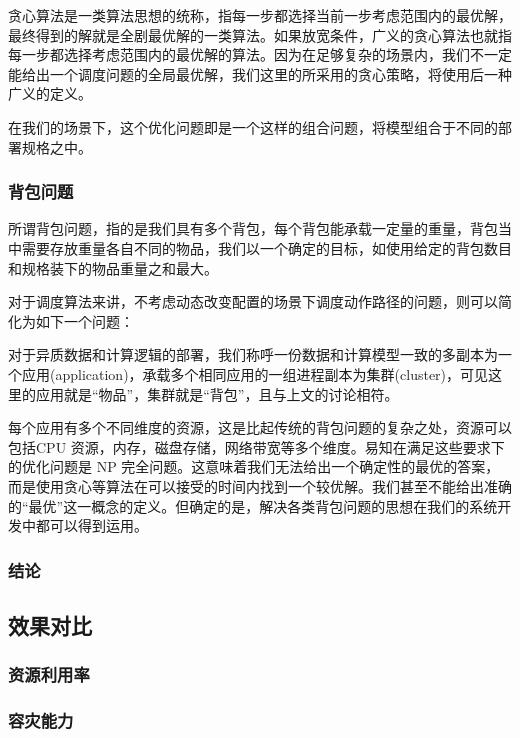 贪心算法是一类算法思想的统称，指每一步都选择当前一步考虑范围内的最优解，最终得到的解就是全剧最优解的一类算法。如果放宽条件，广义的贪心算法也就指每一步都选择考虑范围内的最优解的算法。因为在足够复杂的场景内，我们不一定能给出一个调度问题的全局最优解，我们这里的所采用的贪心策略，将使用后一种广义的定义。

在我们的场景下，这个优化问题即是一个这样的组合问题，将模型组合于不同的部署规格之中。

\subsubsection{背包问题}

所谓背包问题，指的是我们具有多个背包，每个背包能承载一定量的重量，背包当中需要存放重量各自不同的物品，我们以一个确定的目标，如使用给定的背包数目和规格装下的物品重量之和最大。

对于调度算法来讲，不考虑动态改变配置的场景下调度动作路径的问题，则可以简化为如下一个问题：

对于异质数据和计算逻辑的部署，我们称呼一份数据和计算模型一致的多副本为一个应用(application)，承载多个相同应用的一组进程副本为集群(cluster)，可见这里的应用就是“物品”，集群就是“背包”，且与上文的讨论相符。

每个应用有多个不同维度的资源，这是比起传统的背包问题的复杂之处，资源可以包括CPU 资源，内存，磁盘存储，网络带宽等多个维度。易知在满足这些要求下的优化问题是 NP 完全问题。这意味着我们无法给出一个确定性的最优的答案，而是使用贪心等算法在可以接受的时间内找到一个较优解。我们甚至不能给出准确的“最优”这一概念的定义。但确定的是，解决各类背包问题的思想在我们的系统开发中都可以得到运用。

\subsubsection{结论}

\subsection{效果对比}

\subsubsection{资源利用率}

\subsubsection{容灾能力}

